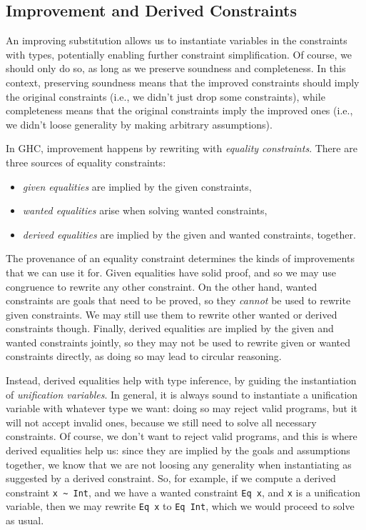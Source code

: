 \documentclass{sigplanconf}
\begin{document}
\subsection{Improvement and Derived Constraints}
An improving substitution \cite{improvement} allows us to instantiate variables
in the constraints with types, potentially enabling further constraint
simplification.  Of course, we should only do so, as long
as we preserve soundness and completeness.  In this context, preserving
soundness means that the improved constraints should imply the original
constraints (i.e., we didn't just drop some constraints),
while completeness means that the original constraints imply the improved ones
(i.e., we didn't loose generality by making arbitrary assumptions).

In GHC, improvement happens by rewriting with {\em equality constraints}.
There are three sources of equality constraints:
\begin{itemize}
\item {\em given equalities} are implied by the given constraints,
\item {\em wanted equalities} arise when solving wanted constraints,
\item {\em derived equalities} are implied by the given and wanted constraints,
together.
\end{itemize}

The provenance of an equality constraint determines the kinds of
improvements that we can use it for.  Given equalities have solid proof,
and so we may use congruence to rewrite any other constraint.
On the other hand, wanted constraints are goals that need to be proved,
so they {\em cannot} be used to rewrite given constraints.  We may still
use them to rewrite other wanted or derived constraints though.
Finally, derived equalities are implied by the given and wanted constraints
jointly, so they may not be used to rewrite given or wanted constraints
directly, as doing so may lead to circular reasoning.

Instead, derived equalities help with type inference, by guiding the
instantiation of {\em unification variables}. In general,
it is always sound to instantiate a unification variable with whatever
type we want: doing so may reject valid programs, but it will not accept
invalid ones, because we still need to solve all necessary constraints.
Of course, we don't want to reject valid programs, and this is where derived
equalities help us: since they are implied by the goals and assumptions
together, we know that we are not loosing any generality when instantiating
as suggested by a derived constraint.  So, for example, if we compute a
derived constraint \Verb"x ~ Int", and we have a wanted constraint
\Verb"Eq x", and \Verb"x" is a unification variable, then we may
rewrite \Verb"Eq x" to \Verb"Eq Int", which we would proceed to solve
as usual.
\end{document}

